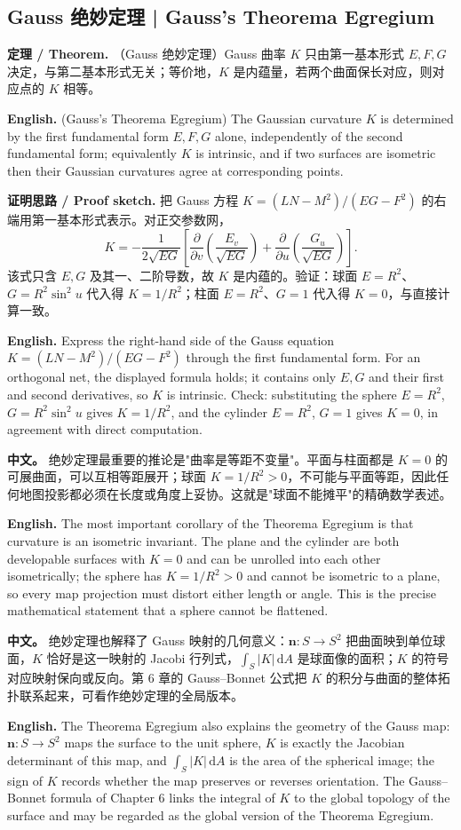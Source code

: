 \documentclass[UTF8,11pt,a4paper]{ctexart}
\newcommand{\APS}[2]{\par\noindent\textbf{中文。} #1\par\noindent\textbf{English.} #2\par\smallskip}
\newcommand{\EN}[1]{\par\noindent \textbf{English.} #1\par}
\newcommand{\THM}[2]{\par\noindent\textbf{定理 / Theorem.} #1\par\EN{#2}\par\smallskip}
\newcommand{\PROOF}[2]{\par\noindent\textbf{证明思路 / Proof sketch.} #1\par\EN{#2}\par\smallskip}
\newcommand{\dd}{\mathrm{d}}
\newcommand{\bn}{\mathbf{n}}
\begin{document}
\subsection{Gauss 绝妙定理 | Gauss's Theorema Egregium}
\THM{（Gauss 绝妙定理）Gauss 曲率 $K$ 只由第一基本形式 $E,F,G$ 决定，与第二基本形式无关；等价地，$K$ 是内蕴量，若两个曲面保长对应，则对应点的 $K$ 相等。}{(Gauss's Theorema Egregium) The Gaussian curvature $K$ is determined by the first fundamental form $E,F,G$ alone, independently of the second fundamental form; equivalently $K$ is intrinsic, and if two surfaces are isometric then their Gaussian curvatures agree at corresponding points.}
\PROOF{把 Gauss 方程 $K=(LN-M^2)/(EG-F^2)$ 的右端用第一基本形式表示。对正交参数网，
\[
K=-\frac{1}{2\sqrt{EG}}\left[\frac{\partial}{\partial v}\!\left(\frac{E_v}{\sqrt{EG}}\right)
+\frac{\partial}{\partial u}\!\left(\frac{G_u}{\sqrt{EG}}\right)\right].
\]
该式只含 $E,G$ 及其一、二阶导数，故 $K$ 是内蕴的。验证：球面 $E=R^2$、$G=R^2\sin^2u$ 代入得 $K=1/R^2$；柱面 $E=R^2$、$G=1$ 代入得 $K=0$，与直接计算一致。}{Express the right-hand side of the Gauss equation $K=(LN-M^2)/(EG-F^2)$ through the first fundamental form. For an orthogonal net, the displayed formula holds; it contains only $E,G$ and their first and second derivatives, so $K$ is intrinsic. Check: substituting the sphere $E=R^2$, $G=R^2\sin^2u$ gives $K=1/R^2$, and the cylinder $E=R^2$, $G=1$ gives $K=0$, in agreement with direct computation.}
\APS{绝妙定理最重要的推论是"曲率是等距不变量"。平面与柱面都是 $K=0$ 的可展曲面，可以互相等距展开；球面 $K=1/R^2>0$，不可能与平面等距，因此任何地图投影都必须在长度或角度上妥协。这就是"球面不能摊平"的精确数学表述。}{The most important corollary of the Theorema Egregium is that curvature is an isometric invariant. The plane and the cylinder are both developable surfaces with $K=0$ and can be unrolled into each other isometrically; the sphere has $K=1/R^2>0$ and cannot be isometric to a plane, so every map projection must distort either length or angle. This is the precise mathematical statement that a sphere cannot be flattened.}
\APS{绝妙定理也解释了 Gauss 映射的几何意义：$\bn:S\to S^2$ 把曲面映到单位球面，$K$ 恰好是这一映射的 Jacobi 行列式，$\int_S|K|\,\dd A$ 是球面像的面积；$K$ 的符号对应映射保向或反向。第 6 章的 Gauss--Bonnet 公式把 $K$ 的积分与曲面的整体拓扑联系起来，可看作绝妙定理的全局版本。}{The Theorema Egregium also explains the geometry of the Gauss map: $\bn:S\to S^2$ maps the surface to the unit sphere, $K$ is exactly the Jacobian determinant of this map, and $\int_S|K|\,\dd A$ is the area of the spherical image; the sign of $K$ records whether the map preserves or reverses orientation. The Gauss--Bonnet formula of Chapter 6 links the integral of $K$ to the global topology of the surface and may be regarded as the global version of the Theorema Egregium.}
\end{document}
